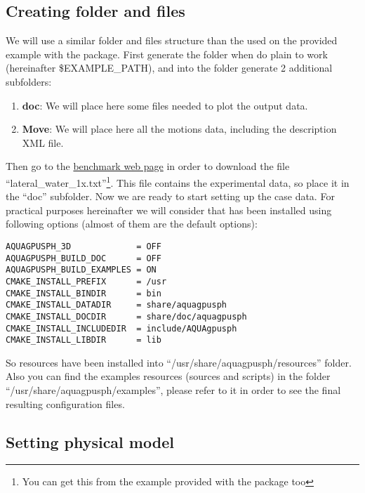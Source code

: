 \subsection{Creating folder and files}
%
We will use a similar folder and files structure than the used on the provided example with the \NAME package.
First generate the folder when do plain to work (hereinafter \$EXAMPLE\_PATH), and into the folder generate
2 additional subfolders:
%
\begin{enumerate}
	\item \textbf{doc}: We will place here some files needed to plot the output data.
	\item \textbf{Move}: We will place here all the motions data, including the description XML file.
\end{enumerate}
%
Then go to the \href{http://canal.etsin.upm.es/ftp/SPHERIC\_BENCHMARKS}{benchmark web page} in order to download
the file ``lateral\_water\_1x.txt''\footnote{You can get this from the example provided with the package too}.
This file contains the experimental data, so place it in the ``doc'' subfolder.\rc
%
Now we are ready to start setting up the case data. For practical purposes hereinafter we will consider that \NAME
has been installed using following options (almost of them are the default options):
%
\begin{verbatim}
AQUAGPUSPH_3D             = OFF
AQUAGPUSPH_BUILD_DOC      = OFF
AQUAGPUSPH_BUILD_EXAMPLES = ON
CMAKE_INSTALL_PREFIX      = /usr
CMAKE_INSTALL_BINDIR      = bin
CMAKE_INSTALL_DATADIR     = share/aquagpusph
CMAKE_INSTALL_DOCDIR      = share/doc/aquagpusph
CMAKE_INSTALL_INCLUDEDIR  = include/AQUAgpusph
CMAKE_INSTALL_LIBDIR      = lib
\end{verbatim}
%
So resources have been installed into ``/usr/share/aquagpusph/resources'' folder. Also you can find the examples
resources (sources and scripts) in the folder ``/usr/share/aquagpusph/examples'', please refer to it in order to
see the final resulting configuration files.
%
\subsection{Setting physical model}
%
